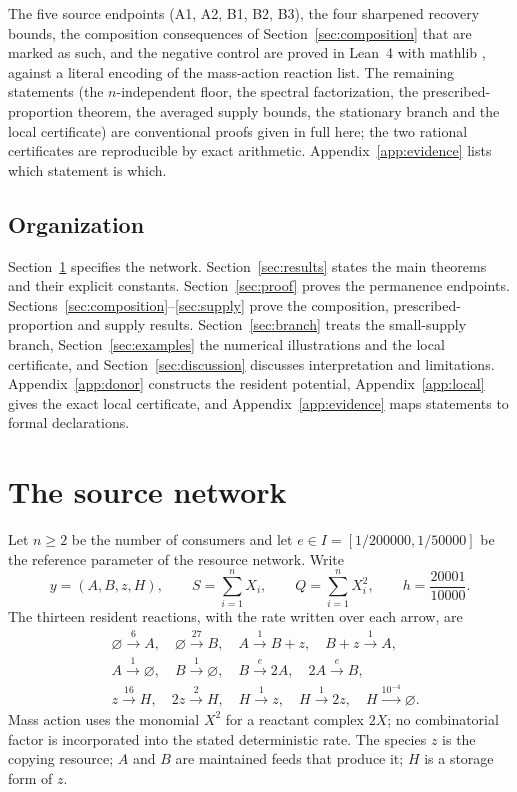 \documentclass[11pt,a4paper]{article}
\theoremstyle{plain}
\theoremstyle{definition}
\theoremstyle{remark}
\begin{document}
The five source endpoints (A1, A2, B1, B2, B3), the four sharpened recovery bounds, the composition consequences of Section~\ref{sec:composition} that are marked as such, and the negative control are proved in Lean~4 \cite{deMouraUllrich2021} with mathlib \cite{mathlib2020}, against a literal encoding of the mass-action reaction list. The remaining statements (the $n$-independent floor, the spectral factorization, the prescribed-proportion theorem, the averaged supply bounds, the stationary branch and the local certificate) are conventional proofs given in full here; the two rational certificates are reproducible by exact arithmetic. Appendix~\ref{app:evidence} lists which statement is which.

\subsection{Organization}
Section~\ref{sec:source} specifies the network. Section~\ref{sec:results} states the main theorems and their explicit constants. Section~\ref{sec:proof} proves the permanence endpoints. Sections~\ref{sec:composition}--\ref{sec:supply} prove the composition, prescribed-proportion and supply results. Section~\ref{sec:branch} treats the small-supply branch, Section~\ref{sec:examples} the numerical illustrations and the local certificate, and Section~\ref{sec:discussion} discusses interpretation and limitations. Appendix~\ref{app:donor} constructs the resident potential, Appendix~\ref{app:local} gives the exact local certificate, and Appendix~\ref{app:evidence} maps statements to formal declarations.

\section{The source network}\label{sec:source}
Let $n\ge2$ be the number of consumers and let $e\in I=[1/200000,1/50000]$ be the reference parameter of the resource network. Write
\[
y=(A,B,z,H),\qquad S=\sum_{i=1}^nX_i,\qquad Q=\sum_{i=1}^nX_i^2,\qquad h=\frac{20001}{10000}.
\]
The thirteen resident reactions, with the rate written over each arrow, are
\begin{align*}
&\varnothing\xrightarrow{6}A,\quad\varnothing\xrightarrow{27}B,
\quad A\xrightarrow{1}B+z,\quad B+z\xrightarrow{1}A,\\
&A\xrightarrow{1}\varnothing,\quad B\xrightarrow{1}\varnothing,
\quad B\xrightarrow{e}2A,\quad 2A\xrightarrow{e}B,\\
&z\xrightarrow{16}H,\quad2z\xrightarrow{2}H,\quad H\xrightarrow{1}z,
\quad H\xrightarrow{1}2z,\quad H\xrightarrow{10^{-4}}\varnothing.
\end{align*}
Mass action uses the monomial $X^2$ for a reactant complex $2X$; no combinatorial factor is incorporated into the stated deterministic rate. The species $z$ is the copying resource; $A$ and $B$ are maintained feeds that produce it; $H$ is a storage form of $z$.
\end{document}

